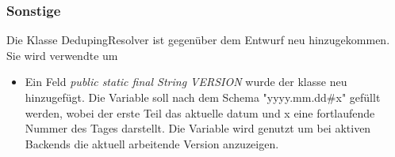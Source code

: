 \subsubsection{Sonstige}
Die Klasse DedupingResolver ist gegenüber dem Entwurf neu hinzugekommen. Sie wird verwendte um %
\noChange
{}
\begin{itemize}[noitemsep]
    \item Ein Feld \textit{public static final String VERSION} wurde der klasse neu hinzugefügt. Die Variable soll nach dem Schema "yyyy.mm.dd\#x" gefüllt werden, wobei der erste Teil das aktuelle datum und x eine fortlaufende Nummer des Tages darstellt. Die Variable wird genutzt um bei aktiven Backends die aktuell arbeitende Version anzuzeigen.
\end{itemize}